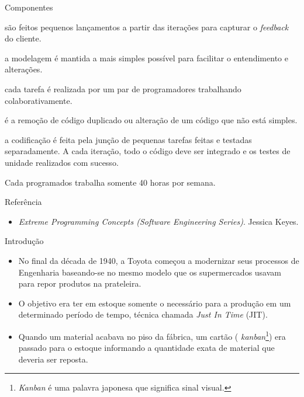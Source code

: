 \begin{frame}{Componentes}{\insertlecture}
  \begin{description}[<+-| alert@+>]
  \item[Pequenos lançamentos:] são feitos pequenos lançamentos a partir 
    das iterações para capturar o {\em feedback} do cliente.
  \item[Modelagem simplificada:] a modelagem é mantida a mais simples 
    possível para facilitar o entendimento e alterações.
  \item[Programação em pares:] cada tarefa é realizada por um par de programadores 
    trabalhando colaborativamente.
  \item[{\em Refactoring:}] é a remoção de código duplicado ou alteração de um código 
    que não está simples.
  \item[Integração contínua:] a codificação é feita pela junção de pequenas tarefas 
    feitas e testadas separadamente. A cada iteração, todo o código deve ser integrado 
    e os testes de unidade realizados com sucesso.
  \item[40 horas:] Cada programados trabalha somente 40 horas por semana.
  \end{description}
\end{frame}

\begin{frame}{Referência}

  \begin{itemize}
  \item {\em Extreme Programming Concepts (Software Engineering Series)}. Jessica Keyes.
  \end{itemize}
  
\end{frame}

\lecturetitle{\insertlecture}{\course}
\frame{\maketitle}

\begin{frame}{\insertlecture}{Introdução}
  
  \begin{itemize}[<+-| alert@+>]
  \item No final da década de 1940, a Toyota começou a modernizar seus
    processos de Engenharia baseando-se no mesmo modelo que os
    supermercados usavam para repor produtos na prateleira.
  \item O objetivo era ter em estoque somente o necessário para a
    produção em um determinado período de tempo, técnica chamada {\em
      Just In Time} (JIT).
  \item Quando um material acabava no piso da fábrica, um cartão ({\em
      kanban}\footnote{{\em Kanban} é uma palavra japonesa que
      significa sinal visual.}) era passado para o estoque informando
    a quantidade exata de material que deveria ser reposta.
  \end{itemize}
  
\end{frame}

